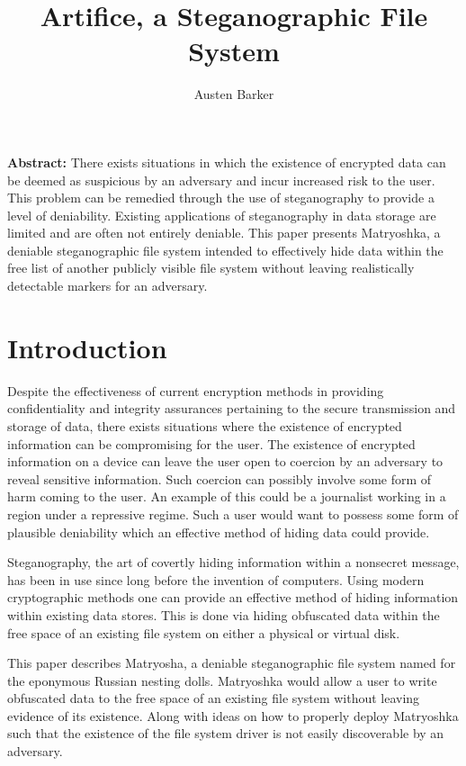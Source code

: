 \documentclass{article}
\begin{document}
\title{Artifice, a Steganographic File System}
\author{Austen Barker}
\maketitle

\begin{multicols}{2}

\textbf{Abstract:} There exists situations in which the existence of encrypted data can be deemed as suspicious by an adversary and incur increased risk to the user. This problem can be remedied through the use of steganography to provide a level of deniability. Existing applications of steganography in data storage are limited and are often not entirely deniable. This paper presents Matryoshka, a deniable steganographic file system intended to effectively hide data within the free list of another publicly visible file system without leaving realistically detectable markers for an adversary. 

\section{Introduction}

Despite the effectiveness of current encryption methods in providing confidentiality and integrity assurances pertaining to the secure transmission and storage of data, there exists situations where the existence of encrypted information can be compromising for the user. The existence of encrypted information on a device can leave the user open to coercion by an adversary to reveal sensitive information. Such coercion can possibly involve some form of harm coming to the user. An example of this could be a journalist working in a region under a repressive regime. Such a user would want to possess some form of plausible deniability which an effective method of hiding data could provide. 

Steganography, the art of covertly hiding information within a nonsecret message, has been in use since long before the invention of computers. Using modern cryptographic methods one can provide an effective method of hiding information within existing data stores. This is done via hiding obfuscated data within the free space of an existing file system on either a physical or virtual disk.

This paper describes Matryosha, a deniable steganographic file system named for the eponymous Russian nesting dolls. Matryoshka would allow a user to write obfuscated data to the free space of an existing file system without leaving evidence of its existence. Along with ideas on how to properly deploy Matryoshka such that the existence of the file system driver is not easily discoverable by an adversary.


\end{multicols}
\end{document}
